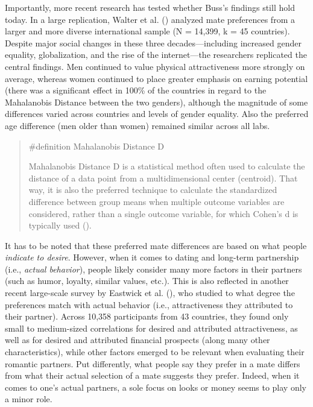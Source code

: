 \documentclass[
  letterpaper,
]{book}
\begin{document}
Importantly, more recent research has tested whether Buss's findings
still hold today. In a large replication, Walter et al.
() analyzed mate preferences from a
larger and more diverse international sample (N = 14,399, k = 45
countries). Despite major social changes in these three
decades---including increased gender equality, globalization, and the
rise of the internet---the researchers replicated the central findings.
Men continued to value physical attractiveness more strongly on average,
whereas women continued to place greater emphasis on earning potential
(there was a significant effect in 100\% of the countries in regard to
the Mahalanobis Distance between the two genders), although the
magnitude of some differences varied across countries and levels of
gender equality. Also the preferred age difference (men older than
women) remained similar across all labs.

\begin{quote}
\label{def-mahalanobisdistanced}{\#definition}
Mahalanobis Distance D

Mahalanobis Distance D is a statistical method often used to calculate
the distance of a data point from a multidimensional center (centroid).
That way, it is also the preferred technique to calculate the
standardized difference between group means when multiple outcome
variables are considered, rather than a single outcome variable, for
which Cohen's d is typically used
().
\end{quote}

It has to be noted that these preferred mate differences are based on
what people \emph{indicate to desire}. However, when it comes to dating
and long-term partnership (i.e., \emph{actual behavior}), people likely
consider many more factors in their partners (such as humor, loyalty,
similar values, etc.). This is also reflected in another recent
large-scale survey by Eastwick et al.
(), who studied to what
degree the preferences match with actual behavior (i.e., attractiveness
they attributed to their partner). Across 10,358 participants from 43
countries, they found only small to medium-sized correlations for
desired and attributed attractiveness, as well as for desired and
attributed financial prospects (along many other characteristics), while
other factors emerged to be relevant when evaluating their romantic
partners. Put differently, what people say they prefer in a mate differs
from what their actual selection of a mate suggests they prefer. Indeed,
when it comes to one's actual partners, a sole focus on looks or money
seems to play only a minor role.
\end{document}
